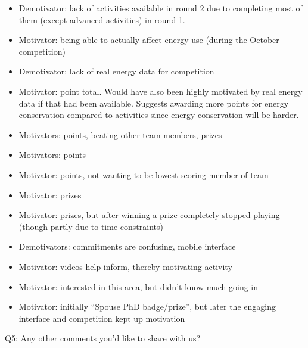 \begin{itemize}
  \item Demotivator: lack of activities available in round 2 due to completing most of them (except advanced activities) in round 1.
  \item Motivator: being able to actually affect energy use (during the October competition)
  \item Demotivator: lack of real energy data for competition
  \item Motivator: point total. Would have also been highly motivated by real energy data if that had been available. Suggests awarding more points for energy conservation compared to activities since energy conservation will be harder.
  \item Motivators: points, beating other team members, prizes
  \item Motivators: points
  \item Motivator: points, not wanting to be lowest scoring member of team
  \item Motivator: prizes
  \item Motivator: prizes, but after winning a prize completely stopped playing (though partly due to time constraints)
  \item Demotivators: commitments are confusing, mobile interface
  \item Motivator: videos help inform, thereby motivating activity
  \item Motivator: interested in this area, but didn't know much going in
  \item Motivator: initially ``Spouse PhD badge/prize'', but later the engaging interface and competition kept up motivation
\end{itemize}

Q5: Any other comments you'd like to share with us?

